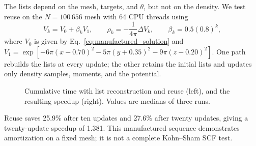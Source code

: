 The lists depend on the mesh, targets, and $\theta$, but not on the density.
We test reuse on the $N=100\,656$ mesh with 64 CPU threads using
\begin{equation}
V_k=V_0+\beta_k V_1,
\qquad \rho_k=-\frac{1}{4\pi}\Delta V_k,
\qquad \beta_k=0.5(0.8)^k,
\label{eq:hnl_reuse_sequence}
\end{equation}
where $V_0$ is given by Eq.~\eqref{eq:manufactured_solution} and
$V_1=\exp[-6\pi(x-0.70)^2-5\pi(y+0.35)^2-9\pi(z-0.20)^2]$.
One path rebuilds the lists at every update; the other retains the initial
lists and updates only density samples, moments, and the potential.

\begin{figure}[!htbp]
\centering
{}
\caption{Cumulative time with list reconstruction and reuse (left), and the
resulting speedup (right). Values are medians of three runs.}
\label{fig:hnl_list_reuse}
\end{figure}

Reuse saves 25.9\% after ten updates and 27.6\% after twenty updates, giving
a twenty-update speedup of 1.381. This manufactured sequence demonstrates
amortization on a fixed mesh; it is not a complete Kohn--Sham SCF test.
